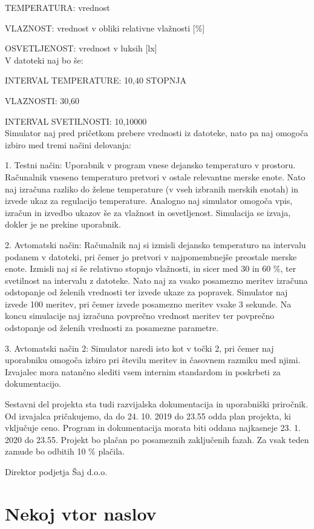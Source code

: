 \documentclass[a4paper,12pt]{article}
\begin{document}
	TEMPERATURA: vrednost 

	VLAZNOST: vrednost v obliki relativne vlažnosti [\%] 

	OSVETLJENOST: vrednost v luksih [lx] 
	\\
	V datoteki naj bo še: 

	INTERVAL TEMPERATURE: 10,40 STOPNJA 
	
	VLAZNOSTI: 30,60 

	INTERVAL SVETILNOSTI: 10,10000 
	\\
	Simulator naj pred pričetkom prebere 
	vrednosti iz datoteke, nato pa naj omogoča izbiro med tremi načini delovanja: 

	1. Testni način: Uporabnik v program vnese dejansko temperaturo v prostoru. Računalnik vneseno 
	temperaturo pretvori v ostale relevantne merske enote. Nato naj izračuna razliko do 
	želene temperature (v vseh izbranih merskih enotah) in izvede ukaz za regulacijo 
	temperature. Analogno naj simulator omogoča vpis, izračun in izvedbo ukazov še za 
	vlažnost in osvetljenost. Simulacija se izvaja, dokler je ne prekine uporabnik. 
	
	2. Avtomatski način: Računalnik naj si izmisli dejansko temperaturo na intervalu 
	podanem v datoteki, pri čemer jo pretvori v najpomembnejše preostale merske enote. 
	Izmisli naj si še relativno stopnjo vlažnosti, in sicer med 30 in 60 \%, ter svetilnost 
	na intervalu z datoteke. Nato naj za vsako posamezno meritev izračuna odstopanje od 
	želenih vrednosti ter izvede ukaze za popravek. Simulator naj izvede 100 meritev, pri 
	čemer izvede posamezno meritev vsake 3 sekunde. Na koncu simulacije naj izračuna 
	povprečno vrednost meritev ter povprečno odstopanje od želenih vrednosti za posamezne 
	parametre. 

	3. Avtomatski način 2: Simulator naredi isto kot v točki 2, pri čemer 
	naj uporabniku omogoča izbiro pri številu meritev in časovnem razmiku med njimi. 
	Izvajalec mora natančno slediti vsem internim standardom in poskrbeti za dokumentacijo. 
	
	Sestavni del projekta sta tudi razvijalska dokumentacija in uporabniški priročnik. 
	Od izvajalca pričakujemo, da do 24. 10. 2019 do 23.55 odda plan projekta, ki vključuje ceno. 
	Program in dokumentacija morata biti oddana najkasneje 23. 1. 2020 do 23.55. 
	Projekt bo plačan po posameznih zaključenih fazah. Za vsak teden zamude bo odbitih 10 \% plačila. 
	\\
	

	\hfill Direktor podjetja Šaj d.o.o.	

\newpage

\section{Nekoj vtor naslov}
\end{document}
